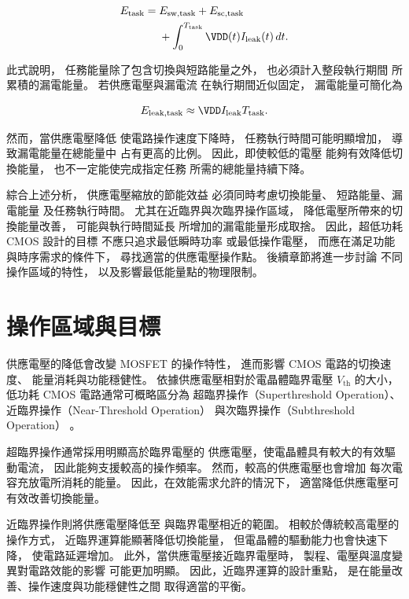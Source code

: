 \begin{equation}
\begin{aligned}
E_{\mathrm{task}}
={}&E_{\mathrm{sw,task}}
+E_{\mathrm{sc,task}}\\
&+\int_0^{T_{\mathrm{task}}}
\VDD(t)I_{\mathrm{leak}}(t)\,dt.
\end{aligned}
\label{eq:taskenergy}
\end{equation}

此式說明，
任務能量除了包含切換與短路能量之外，
也必須計入整段執行期間
所累積的漏電能量。
若供應電壓與漏電流
在執行期間近似固定，
漏電能量可簡化為

\begin{equation*}
E_{\mathrm{leak,task}}
\approx
\VDD I_{\mathrm{leak}}T_{\mathrm{task}}.
\end{equation*}

然而，當供應電壓降低
使電路操作速度下降時，
任務執行時間可能明顯增加，
導致漏電能量在總能量中
占有更高的比例。
因此，即使較低的電壓
能夠有效降低切換能量，
也不一定能使完成指定任務
所需的總能量持續下降。

綜合上述分析，
供應電壓縮放的節能效益
必須同時考慮切換能量、
短路能量、漏電能量
及任務執行時間。
尤其在近臨界與次臨界操作區域，
降低電壓所帶來的切換能量改善，
可能與執行時間延長
所增加的漏電能量形成取捨。
因此，超低功耗 CMOS 設計的目標
不應只追求最低瞬時功率
或最低操作電壓，
而應在滿足功能與時序需求的條件下，
尋找適當的供應電壓操作點。
後續章節將進一步討論
不同操作區域的特性，
以及影響最低能量點的物理限制。

\section{操作區域與目標}
\label{sec:operating_regions}

供應電壓的降低會改變 MOSFET 的操作特性，
進而影響 CMOS 電路的切換速度、
能量消耗與功能穩健性。
依據供應電壓相對於電晶體臨界電壓
$V_{\mathrm{th}}$ 的大小，
低功耗 CMOS 電路通常可概略區分為
超臨界操作（Superthreshold Operation）、
近臨界操作（Near-Threshold Operation）
與次臨界操作（Subthreshold Operation）
\cite{dreslinski2010,calhoun2005,markovic2010}。

超臨界操作通常採用明顯高於臨界電壓的
供應電壓，使電晶體具有較大的有效驅動電流，
因此能夠支援較高的操作頻率。
然而，較高的供應電壓也會增加
每次電容充放電所消耗的能量。
因此，在效能需求允許的情況下，
適當降低供應電壓可有效改善切換能量。

近臨界操作則將供應電壓降低至
與臨界電壓相近的範圍。
相較於傳統較高電壓的操作方式，
近臨界運算能顯著降低切換能量，
但電晶體的驅動能力也會快速下降，
使電路延遲增加。
此外，當供應電壓接近臨界電壓時，
製程、電壓與溫度變異對電路效能的影響
可能更加明顯。
因此，近臨界運算的設計重點，
是在能量改善、操作速度與功能穩健性之間
取得適當的平衡。

